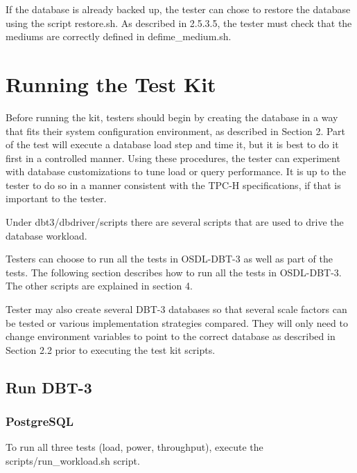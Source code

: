 \documentclass{article}
\begin{document}
\noindent
If the database is already backed up, the tester can chose to restore
the database using the script restore.sh.  As described in 2.5.3.5,
the tester must check that the mediums are correctly defined in
defime\_medium.sh.

\section{Running the Test Kit}

\noindent
Before running the kit, testers should begin by creating the
database in a way that fits their system configuration environment,
as described in Section 2.  Part of the test will execute a database
load step and time it, but it is best to do it first in a controlled
manner.  Using these procedures, the tester can experiment with
database customizations to tune load or query performance.  It is up
to the tester to do so in a manner consistent with the TPC-H
specifications, if that is important to the tester.

\noindent
Under dbt3/dbdriver/scripts there are several scripts that are used
to drive the database workload.

\noindent
Testers can choose to run all the tests in OSDL-DBT-3 as well as part
of the tests.  The following section describes how to run all the
tests in OSDL-DBT-3.  The other scripts  are explained in section 4.

\noindent
Tester may also create several DBT-3 databases so that several scale
factors can be tested or various implementation strategies compared.
They will only need to change environment variables to point to the
correct database as described in Section 2.2 prior to executing the
test kit scripts.

\subsection{Run DBT-3}

\subsubsection{PostgreSQL}

\noindent
To run all three tests (load, power, throughput), execute the
scripts/run\_workload.sh script.
\end{document}
